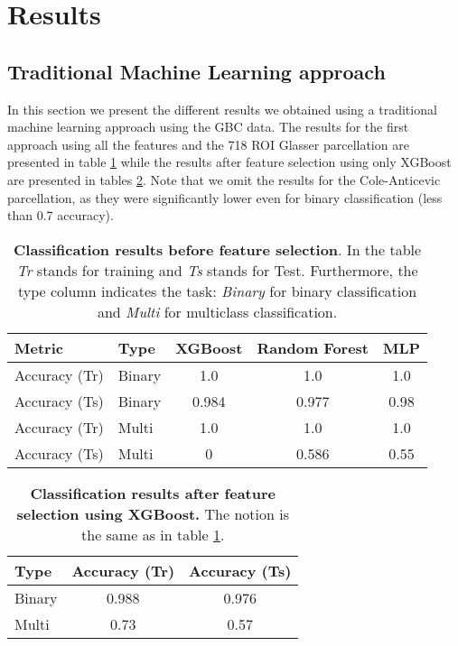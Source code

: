 \documentclass[fleqn,moreauthors,10pt]{ds_report}
\begin{document}
\section*{Results} \label{results}

\subsection*{Traditional Machine Learning approach}

In this section we present the different results we obtained using a traditional machine learning approach using the GBC data. The results for the first approach using all the features and the 718 ROI Glasser parcellation are presented in table \ref{tab:glassier_classification} while the results after feature selection using only XGBoost are presented in tables \ref{tab:feature_selection_results}. Note that we omit the results for the Cole-Anticevic parcellation, as they were significantly lower even for binary classification (less than 0.7 accuracy). 

\begin{table}[h!]
\centering
\begin{tabular}{|l|l| c|c|c|}
\hline
\textbf{Metric} & \textbf{Type} & \textbf{XGBoost} & \textbf{Random Forest}& \textbf{MLP} \\ \hline
Accuracy (Tr) & Binary & 1.0 & 1.0 & 1.0 \\ \hline
Accuracy (Ts) & Binary & 0.984 & 0.977 & 0.98 \\ \hline
Accuracy (Tr) & Multi & 1.0 & 1.0 & 1.0 \\ \hline
Accuracy (Ts) & Multi & 0 & 0.586 & 0.55 \\ \hline
\end{tabular}
\caption{\textbf{Classification results before feature selection}. In the table \textit{Tr} stands for training and \textit{Ts} stands for Test. Furthermore, the type column indicates the task: \textit{Binary} for binary classification and \textit{Multi} for multiclass classification.}
\label{tab:glassier_classification}
\end{table}

\begin{table}[h!]
\centering
\begin{tabular}{|l|c|c|}
\hline
\textbf{Type} & \textbf{Accuracy (Tr)} & \textbf{Accuracy (Ts)}\\ \hline
Binary & 0.988 &  0.976 \\ \hline
Multi & 0.73 & 0.57\\ \hline
\end{tabular}
\caption{\textbf{Classification results after feature selection using XGBoost.} The notion is the same as in table \ref{tab:glassier_classification}.}
\label{tab:feature_selection_results}
\end{table}
\end{document}
